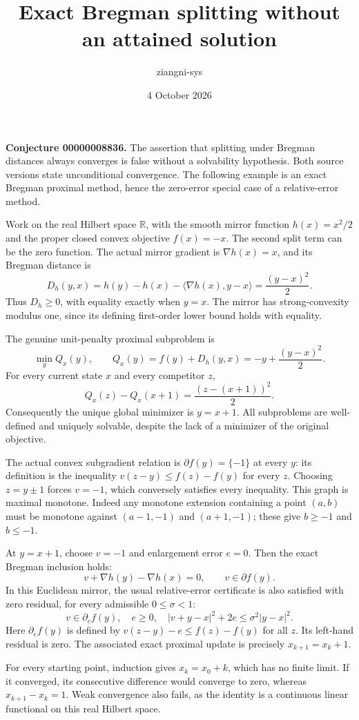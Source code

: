 \documentclass[11pt]{article}
\title{Exact Bregman splitting without an attained solution}
\author{ziangni-sys}
\date{4 October 2026}
\begin{document}
\maketitle
\noindent\textbf{Conjecture 00000008836.} The assertion that splitting under Bregman distances always converges is false without a solvability hypothesis. Both source versions state unconditional convergence. The following example is an exact Bregman proximal method, hence the zero-error special case of a relative-error method.

Work on the real Hilbert space $\mathbb R$, with the smooth mirror function $h(x)=x^2/2$ and the proper closed convex objective $f(x)=-x$. The second split term can be the zero function. The actual mirror gradient is $\nabla h(x)=x$, and its Bregman distance is
\[
 D_h(y,x)=h(y)-h(x)-\langle\nabla h(x),y-x\rangle
 =\frac{(y-x)^2}{2}.
\]
Thus $D_h\geq0$, with equality exactly when $y=x$. The mirror has strong-convexity modulus one, since its defining first-order lower bound holds with equality.

The genuine unit-penalty proximal subproblem is
\[
 \min_y Q_x(y),\qquad Q_x(y)=f(y)+D_h(y,x)
 =-y+\frac{(y-x)^2}{2}.
\]
For every current state $x$ and every competitor $z$,
\[
 Q_x(z)-Q_x(x+1)=\frac{(z-(x+1))^2}{2}.
\]
Consequently the unique global minimizer is $y=x+1$. All subproblems are well-defined and uniquely solvable, despite the lack of a minimizer of the original objective.

The actual convex subgradient relation is $\partial f(y)=\{-1\}$ at every $y$: its definition is the inequality $v(z-y)\leq f(z)-f(y)$ for every $z$. Choosing $z=y\pm1$ forces $v=-1$, which conversely satisfies every inequality. This graph is maximal monotone. Indeed any monotone extension containing a point $(a,b)$ must be monotone against $(a-1,-1)$ and $(a+1,-1)$; these give $b\geq-1$ and $b\leq-1$.

At $y=x+1$, choose $v=-1$ and enlargement error $e=0$. Then the exact Bregman inclusion holds:
\[
 v+\nabla h(y)-\nabla h(x)=0,\qquad v\in\partial f(y).
\]
In this Euclidean mirror, the usual relative-error certificate is also satisfied with zero residual, for every admissible $0\leq\sigma<1$:
\[
 v\in\partial_e f(y),\quad e\geq0,\quad
 |v+y-x|^2+2e\leq\sigma^2|y-x|^2.
\]
Here $\partial_e f(y)$ is defined by $v(z-y)-e\leq f(z)-f(y)$ for all $z$. Its left-hand residual is zero. The associated exact proximal update is precisely $x_{k+1}=x_k+1$.

For every starting point, induction gives $x_k=x_0+k$, which has no finite limit. If it converged, its consecutive difference would converge to zero, whereas $x_{k+1}-x_k=1$. Weak convergence also fails, as the identity is a continuous linear functional on this real Hilbert space.
\end{document}
